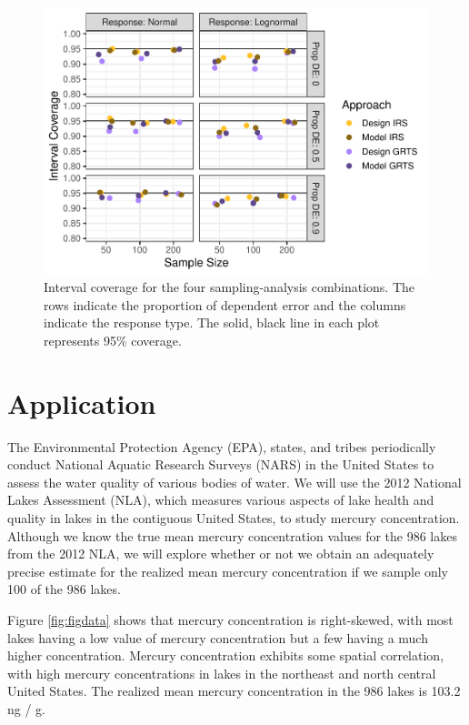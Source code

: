 \documentclass[]{elsarticle} %
\begin{document}
\begin{figure}
\includegraphics[width=1\linewidth]{manuscript_files/figure-latex/figconf-1} \caption{Interval coverage for the four sampling-analysis combinations. The rows indicate the proportion of dependent error and the columns indicate the response type. The solid, black line in each plot represents 95\% coverage.}\label{fig:figconf}
\end{figure}

\hypertarget{application}{%
\section{Application}\label{application}}

The Environmental Protection Agency (EPA), states, and tribes
periodically conduct National Aquatic Research Surveys (NARS) in the
United States to assess the water quality of various bodies of water. We
will use the 2012 National Lakes Assessment (NLA), which measures
various aspects of lake health and quality in lakes in the contiguous
United States, to study mercury concentration. Although we know the true
mean mercury concentration values for the 986 lakes from the 2012 NLA,
we will explore whether or not we obtain an adequately precise estimate
for the realized mean mercury concentration if we sample only 100 of the
986 lakes.

Figure \ref{fig:figdata} shows that mercury concentration is
right-skewed, with most lakes having a low value of mercury
concentration but a few having a much higher concentration. Mercury
concentration exhibits some spatial correlation, with high mercury
concentrations in lakes in the northeast and north central United
States. The realized mean mercury concentration in the 986 lakes is
103.2 ng / g.
\end{document}
